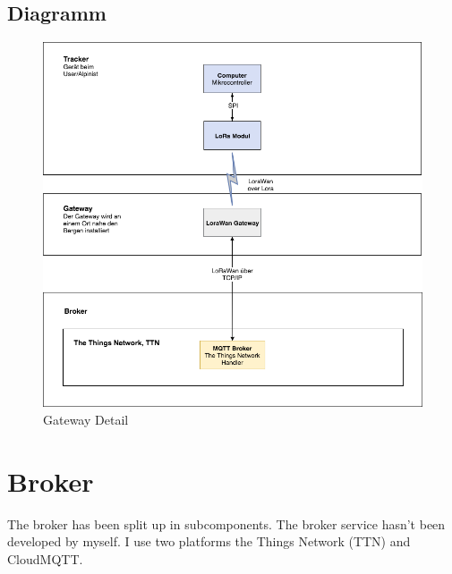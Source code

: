 \documentclass[11pt,english,german]{report}
\theoremstyle{definition}
\begin{document}
\subsection{Diagramm}
\begin{figure}[H]
	\centering
	\includegraphics[width=\textwidth]{img/system/ATAS_SystemOverview_Detail_Gateway_BA.png}
	\caption[Gateway Detail]
	{Gateway Detail}
\end{figure}

\newpage
\section{Broker}
The broker has been split up in subcomponents. The broker service hasn’t been developed
by myself. I use two platforms the Things Network (TTN) and CloudMQTT.
\end{document}
